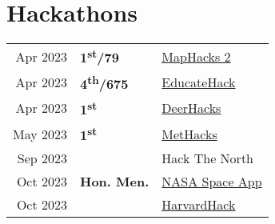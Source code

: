 
  \section{Hackathons}
  \begin{tabular}{rll}
      Apr 2023 & \bf{1\textsuperscript{st}/79}  & \href{https://devpost.com/software/tbd-p9xqhv}{MapHacks 2}                                        \\
      Apr 2023 & \bf{4\textsuperscript{th}/675} & \href{https://devpost.com/software/hackthefeed-1ycujf}{EducateHack}                               \\
      Apr 2023 & \bf{1\textsuperscript{st}}     & \href{https://devpost.com/software/tba-z5dkvc}{DeerHacks}                                         \\
      May 2023 & \bf{1\textsuperscript{st}}     & \href{https://devpost.com/software/tba-asjk6y}{MetHacks}                                          \\
      Sep 2023 &                                & Hack The North                                                                                    \\
      Oct 2023 & \bf{Hon. Men.}                 & \href{https://www.spaceappschallenge.org/2023/find-a-team/intergalactic-pirates/}{NASA Space App} \\
      Oct 2023 &                                & \href{https://devpost.com/software/dataplace}{HarvardHack}                                        \\
  \end{tabular}
  \sectionsep